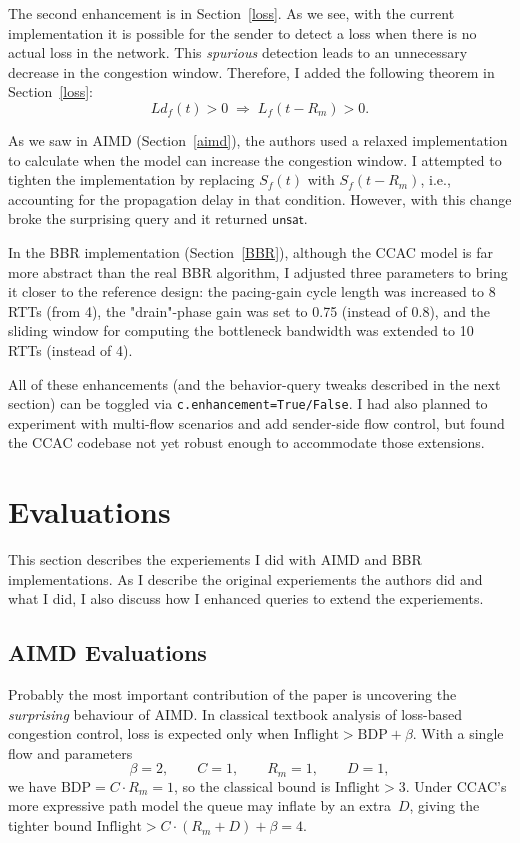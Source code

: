 \documentclass[12pt]{l4dc2023}
\begin{document}
The second enhancement is in Section~\ref{loss}. As we see, with the current implementation it is possible for the sender to detect a loss when there is no actual loss in the network. This \emph{spurious} detection leads to an unnecessary decrease in the congestion window. Therefore, I added the following theorem in Section~\ref{loss}:
\[
  Ld_f(t) > 0 \;\Longrightarrow\; L_f(t - R_m) > 0.
\]

As we saw in AIMD (Section~\ref{aimd}), the authors used a relaxed implementation to calculate when the model can increase the congestion window. I attempted to tighten the implementation by replacing $S_f(t)$ with $S_f(t - R_m)$,
i.e., accounting for the propagation delay in that condition. However, with this change broke the surprising query and it returned \(\mathsf{unsat}\).

In the BBR implementation (Section~\ref{BBR}), although the CCAC model is far more abstract than the real BBR algorithm, I adjusted three parameters to bring it closer to the reference design: the pacing-gain cycle length was increased to 8 RTTs (from 4), the "drain"-phase gain was set to 0.75 (instead of 0.8), and the sliding window for computing the bottleneck bandwidth was extended to 10 RTTs (instead of 4). 

All of these enhancements (and the behavior-query tweaks described in the next section) can be toggled via
\texttt{c.enhancement=True/False}. I had also planned to experiment with multi-flow scenarios and add sender-side flow control, but found the CCAC codebase not yet robust enough to accommodate those extensions.

\section{Evaluations}\label{evaluation}
This section describes the experiements I did with AIMD and BBR implementations. As I describe the original experiements the authors did and what I did, I also discuss how I enhanced queries to extend the experiements. 

\subsection{AIMD Evaluations}
Probably the most important contribution of the paper is uncovering the \emph{surprising} behaviour of AIMD.  In classical textbook analysis of loss-based congestion control, loss is expected only when
\(\text{Inflight} > \mathrm{BDP} + \beta\).
With a single flow and parameters
\[
\beta = 2,\qquad C = 1,\qquad R_m = 1,\qquad D = 1,
\]
we have \(\mathrm{BDP}=C\!\cdot\! R_m = 1\), so the classical bound is \(\text{Inflight}>3\). Under CCAC's more expressive path model the queue may inflate by an extra~\(D\), giving the tighter bound
\(\text{Inflight}>C\!\cdot\!(R_m+D)+\beta = 4\).
\end{document}
